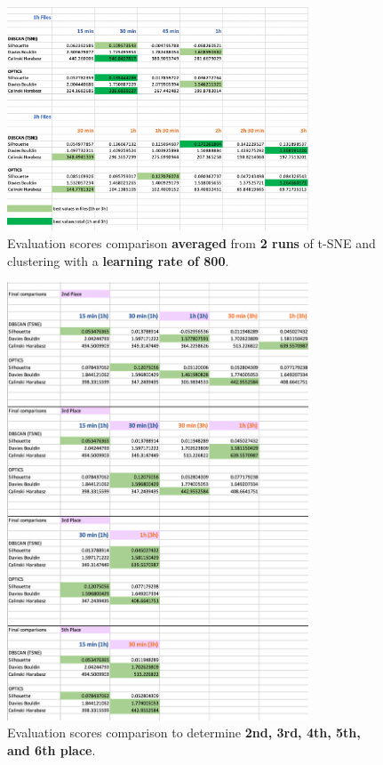 \begin{figure}[H]
  \centering
  \includegraphics[width=0.8\textwidth]{./images/clusteringResults/clusteringResults5.png}
  \caption{Evaluation scores comparison \textbf{averaged} from \textbf{2 runs} of t-SNE and clustering with a \textbf{learning rate of 800}.}
  \label{figure:clusteringResults5}
\end{figure}

\begin{figure}[H]
  \centering
  \includegraphics[width=0.8\textwidth]{./images/clusteringResults/clusteringResultsPlaces.png}
  \caption{Evaluation scores comparison to determine \textbf{2nd, 3rd, 4th, 5th, and 6th place}.}
  \label{figure:clusterResultsPlaces}
\end{figure}

